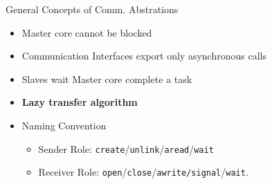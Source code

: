 		\begin{frame}[fragile]{General Concepts of Comm. Abstrations}
			\begin{itemize}
				\item Master core cannot be blocked
				\item Communication Interfaces export only asynchronous calls
				\item Slaves wait Master core complete a task
				\item \textbf{Lazy transfer algorithm}
				\item Naming Convention
				\begin{itemize}
					\item Sender Role: \texttt{create}/\texttt{unlink}/\texttt{aread}/\texttt{wait}
					\item Receiver Role: \texttt{open}/\texttt{close}/\texttt{awrite/signal}/\texttt{wait}.
				\end{itemize}
			\end{itemize}


		\end{frame}

